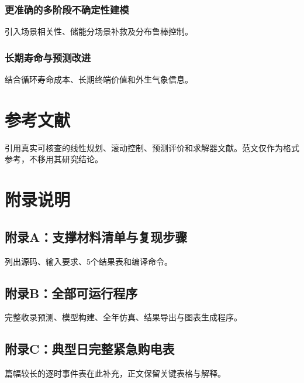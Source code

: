 \documentclass[UTF8,a4paper,zihao=-4]{ctexart}
\begin{document}
\subsubsection{更准确的多阶段不确定性建模}引入场景相关性、储能分场景补救及分布鲁棒控制。
\subsubsection{长期寿命与预测改进}结合循环寿命成本、长期终端价值和外生气象信息。
\section{参考文献}
\noindent 引用真实可核查的线性规划、滚动控制、预测评价和求解器文献。范文仅作为格式参考，不移用其研究结论。
\section*{附录说明}
\subsection*{附录A：支撑材料清单与复现步骤}列出源码、输入要求、5个结果表和编译命令。
\subsection*{附录B：全部可运行程序}完整收录预测、模型构建、全年仿真、结果导出与图表生成程序。
\subsection*{附录C：典型日完整紧急购电表}篇幅较长的逐时事件表在此补充，正文保留关键表格与解释。
\end{document}
